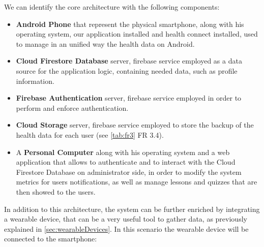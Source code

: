 \newpage
\noindent We can identify the core architecture with the following components:
\vspace{3ex}
\begin{itemize}[nosep] %
    \item \textbf{Android Phone} that represent the physical smartphone, along with his operating system, our application installed and health connect installed, used to manage in an unified way the health data on Android.
    \item \textbf{Cloud Firestore Database} server, firebase service employed as a data source for the application logic, containing needed data, such as profile information.
    \item \textbf{Firebase Authentication} server, firebase service employed in order to perform and enforce authentication.
    \item \textbf{Cloud Storage} server, firebase service employed to store the backup of the health data for each user (see \cref{tab:fr3} FR 3.4).
    \item A \textbf{Personal Computer} along with his operating system and a web application that allows to authenticate and to interact with the Cloud Firestore Database on administrator side, in order to modify the system metrics for users notifications, as well as manage lessons and quizzes that are then showed to the users.  
\end{itemize}
\newpage
\noindent In addition to this architecture, the system can be further enriched by integrating a wearable device, that can be a very useful tool to gather data, as previously explained in \cref{sec:wearableDevices}. In this scenario the wearable device will be connected to the smartphone:

